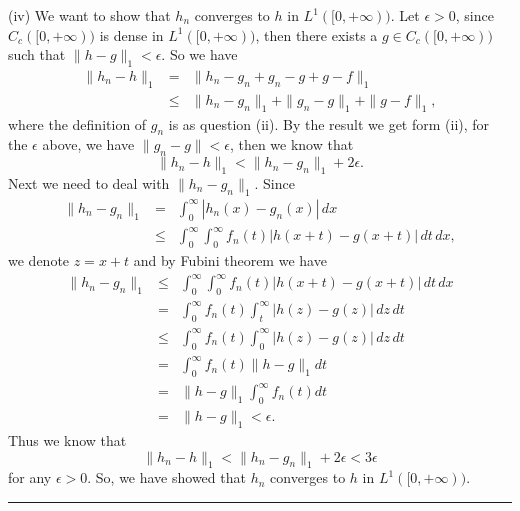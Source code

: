 \documentclass[12pt]{article}
\begin{document}
(iv) We want to show that $h_{n}$ converges to $h$ in $L^{1}([0, + \infty))$. Let $\epsilon > 0$, since $C_{c}([0, + \infty))$ is dense in $L^{1}([0, + \infty))$, then there exists a $g \in C_{c} ([0, + \infty))$ such that $\|h - g\|_{1} < \epsilon$. So we have
\begin{eqnarray*}
\|h_{n} - h \|_{1}  & = & \| h_{n} - g_{n} + g_{n} - g + g - f \|_{1} \\
& \leq & \|h_{n} - g_{n}\|_{1} + \|g_{n} - g\|_{1} + \| g - f \|_{1},
\end{eqnarray*}
where the definition of $g_{n}$ is as question (ii). By the result we get form (ii), for the $\epsilon$ above, we have $\|g_{n} - g\| < \epsilon$, then we know that
\begin{equation*}
    \|h_{n} - h \|_{1} < \|h_{n} - g_{n}\|_{1} + 2 \epsilon.
\end{equation*}
Next we need to deal with $\|h_{n} - g_{n}\|_{1}$. Since
\begin{eqnarray*}
\|h_{n} - g_{n}\|_{1} & = & \int_{0}^{\infty} |h_{n} (x)- g_{n} (x)| \, d x \\
& \leq & \int_{0}^{\infty} \int_{0}^{\infty} f_{n} (t) |h(x + t) - g(x + t)| \, d t \, d x,
\end{eqnarray*}
we denote $z = x + t$ and by Fubini theorem we have
\begin{eqnarray*}
\|h_{n} - g_{n}\|_{1}  & \leq & \int_{0}^{\infty} \int_{0}^{\infty} f_{n} (t) |h(x + t) - g(x + t)| \, d t \, d x \\
& = & \int_{0}^{\infty}  f_{n} (t) \int_{t}^{\infty} |h(z) - g(z)| \, d z \, d t \\
& \leq & \int_{0}^{\infty}  f_{n} (t) \int_{0}^{\infty} |h(z) - g(z)| \, d z \, d t \\
& = & \int_{0}^{\infty}  f_{n} (t) \|h - g\|_{1} d t \\
& = & \|h - g\|_{1} \int_{0}^{\infty} f_{n} (t) d t \\
& = & \|h - g\|_{1} < \epsilon.
\end{eqnarray*}
Thus we know that 
\begin{equation*}
    \|h_{n} - h\|_{1} < \|h_{n} - g_{n}\|_{1} + 2 \epsilon < 3 \epsilon
\end{equation*}
for any $\epsilon > 0$. So, we have showed that $h_{n}$ converges to $h$ in $L^{1}([0, + \infty))$.

\noindent\rule[0.25\baselineskip]{\textwidth}{0.5pt}

\vspace{8pt}
\end{document}
